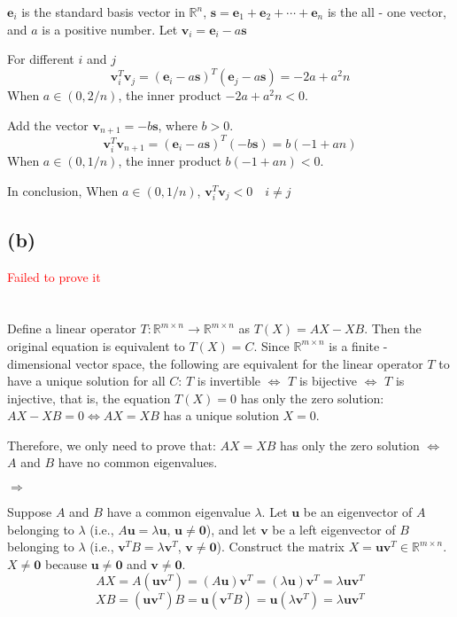 \documentclass{article}
\begin{document}
$ \mathbf{e}_i $ is the standard basis vector in $ \mathbb{R}^n $, $ \mathbf{s} = \mathbf{e}_1 + \mathbf{e}_2 + \cdots + \mathbf{e}_n $ is the all - one vector, and $ a $ is a positive number. Let $ \mathbf{v}_i = \mathbf{e}_i - a\mathbf{s} $

For different $ i $ and $ j $
$$
\mathbf{v}_i^T\mathbf{v}_j = (\mathbf{e}_i - a\mathbf{s})^T(\mathbf{e}_j - a\mathbf{s}) = - 2a + a^2n
$$
When $ a\in(0, 2/n) $, the inner product $ - 2a + a^2n < 0 $.


Add the vector $ \mathbf{v}_{n + 1} = -b\mathbf{s} $, where $ b > 0 $.
$$
\mathbf{v}_i^T\mathbf{v}_{n + 1} = (\mathbf{e}_i - a\mathbf{s})^T(-b\mathbf{s}) = b(- 1 + an)
$$
When $ a\in(0, 1/n) $, the inner product $ b(- 1 + an) < 0 $.

In conclusion, When $ a\in(0, 1/n) $, $\mathbf{v}_i^T\mathbf{v}_j <0 \quad i\neq j$

\subsection*{(b)} 

\textcolor{red}{Failed to prove it}

\section{}

Define a linear operator $ T: \mathbb{R}^{m \times n} \to \mathbb{R}^{m \times n} $ as $ T(X) = AX - XB $. Then the original equation is equivalent to $ T(X) = C $. Since $ \mathbb{R}^{m \times n} $ is a finite - dimensional vector space, the following are equivalent for the linear operator $ T $ to have a unique solution for all $ C $: $ T $ is invertible $ \Leftrightarrow $ $ T $ is bijective $ \Leftrightarrow $ $ T $ is injective, that is, the equation $ T(X) = 0 $ has only the zero solution:$AX - XB = 0 \Leftrightarrow AX = XB$ has a unique solution $ X = 0 $.

Therefore, we only need to prove that: $ AX = XB $ has only the zero solution $ \Leftrightarrow $ $ A $ and $ B $ have no common eigenvalues.

$\Rightarrow$

Suppose $ A $ and $ B $ have a common eigenvalue $ \lambda $. Let $ \mathbf{u} $ be an eigenvector of $ A $ belonging to $ \lambda $ (i.e., $ A\mathbf{u} = \lambda \mathbf{u} $, $ \mathbf{u} \neq \mathbf{0} $), and let $ \mathbf{v} $ be a left eigenvector of $ B $ belonging to $ \lambda $ (i.e., $ \mathbf{v}^T B = \lambda \mathbf{v}^T $, $ \mathbf{v} \neq \mathbf{0} $). Construct the matrix $ X = \mathbf{u} \mathbf{v}^T \in \mathbb{R}^{m \times n} $. $ X \neq \mathbf{0} $ because $ \mathbf{u} \neq \mathbf{0} $ and $ \mathbf{v} \neq \mathbf{0} $.
$$
AX = A(\mathbf{u} \mathbf{v}^T) = (A \mathbf{u}) \mathbf{v}^T = (\lambda \mathbf{u}) \mathbf{v}^T = \lambda \mathbf{u} \mathbf{v}^T
$$
$$
XB = (\mathbf{u} \mathbf{v}^T) B = \mathbf{u} (\mathbf{v}^T B) = \mathbf{u} (\lambda \mathbf{v}^T) = \lambda \mathbf{u} \mathbf{v}^T
$$
\end{document}
